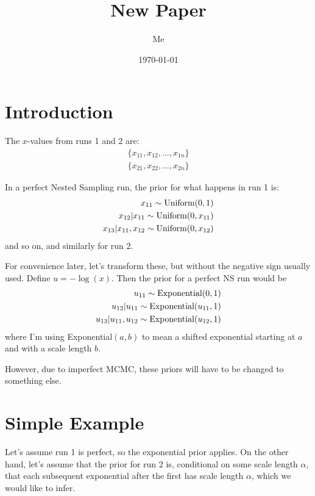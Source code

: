 \documentclass[a4paper, 11pt]{article}
\title{New Paper}
\author{Me}
\date{\today}
\begin{document}
\maketitle


\section{Introduction}
The $x$-values from runs 1 and 2 are:
\begin{eqnarray}
\{x_{11}, x_{12}, ..., x_{1n}\}\\
\{x_{21}, x_{22}, ..., x_{2n}\}
\end{eqnarray}

In a perfect Nested Sampling run, the prior for what happens in run 1 is:
\begin{eqnarray}
x_{11} \sim \textnormal{Uniform}(0, 1)\\
x_{12} | x_{11} \sim \textnormal{Uniform}(0, x_{11})\\
x_{13} | x_{11}, x_{12} \sim \textnormal{Uniform}(0, x_{12})
\end{eqnarray}
and so on, and similarly for run 2.

For convenience later, let's transform these, but without the negative sign
usually used. Define $u=-\log(x)$. Then the prior for a perfect NS run would be
\begin{eqnarray}
u_{11} \sim \textnormal{Exponential}(0, 1)\\
u_{12} | u_{11} \sim \textnormal{Exponential}(u_{11}, 1)\\
u_{13} | u_{11}, u_{12} \sim \textnormal{Exponential}(u_{12}, 1)
\end{eqnarray}
where I'm using Exponential$(a, b)$ to mean a shifted exponential starting
at $a$ and with a scale length $b$.

However, due to imperfect MCMC, these priors will have to be changed to
something else.

\section{Simple Example}
Let's assume run 1 is perfect, so the exponential prior applies. On the other
hand, let's assume that the prior for run 2 is, conditional on some scale
length $\alpha$, that each subsequent exponential after the first has scale
length $\alpha$, which we would like to infer.
\end{document}
